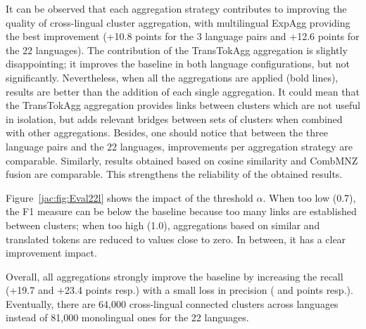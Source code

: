 \documentclass[output=paper]{langsci/langscibook}
\begin{document}
It can be observed that each aggregation strategy contributes to
improving the quality of cross-lingual cluster aggregation, with
multilingual ExpAgg providing the best improvement (+10.8 points for
the 3 language pairs and +12.6 points for the 22 languages). The
contribution of the TransTokAgg aggregation is slightly
disappointing; it improves the baseline in both language
configurations, but not significantly.  Nevertheless, when all the
aggregations are applied (bold lines), results are better than the
addition of each single aggregation. It could mean that the
TransTokAgg aggregation provides links between clusters which are
not useful in isolation, but adds relevant bridges between sets of
clusters when combined with other aggregations. Besides, one should
notice that between the three language pairs and the 22 languages,
improvements per aggregation strategy are comparable. Similarly,
results obtained based on cosine similarity and CombMNZ fusion are
comparable.  This strengthens the reliability of the obtained results.

Figure~\ref{jac:fig:Eval22l} shows the impact of the threshold
$\alpha$. When too low (0.7), the F1 measure can be below the baseline
because too many links are established between clusters; when too high
(1.0), aggregations based on similar and translated tokens are reduced
to values close to zero.  In between, it has a clear improvement
impact.

Overall, all aggregations strongly improve the baseline by increasing
the recall (+19.7 and +23.4 points resp.) with a small loss in
precision ( and  points resp.). Eventually, there are 64,000
cross-lingual connected clusters across languages instead of 81,000
monolingual ones for the 22 languages.
\end{document}
